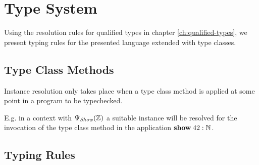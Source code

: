 \chapter{Type System}
\label{ch:type-system}

Using the resolution rules for qualified types in chapter \ref{ch:qualified-types}, we present typing rules for the presented language extended with type classes.

\section{Type Class Methods}

Instance resolution only takes place when a type class method is applied at some point in a program to be typechecked.

E.g. in a context with $\Psi_\mathit{Show}(\mathbb{Z})$ a suitable instance will be resolved for the invocation of the type class method in the application ${\bf show} \; 42 : \mathbb{N}$.



\section{Typing Rules}

